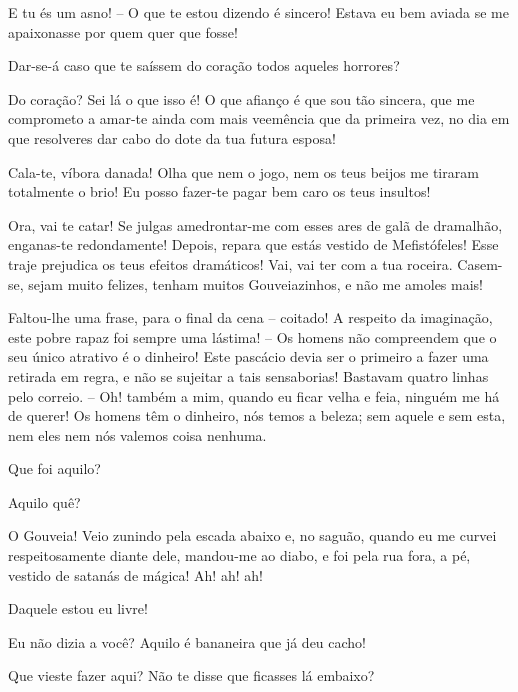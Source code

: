  E tu és um asno! -- O que te estou dizendo é sincero! Estava eu bem
aviada se me apaixonasse por quem quer que fosse!

 Dar-se-á caso que te saíssem do coração todos aqueles horrores?

 Do coração? Sei lá o que isso é! O que afianço é que sou tão
sincera, que me comprometo a amar-te ainda com mais veemência que da primeira vez, no
dia em que resolveres dar cabo do dote da tua futura esposa!

  Cala-te, víbora danada! Olha que nem o jogo,
nem os teus beijos me tiraram totalmente o brio! Eu posso fazer-te pagar
bem caro os teus insultos!

 Ora, vai te catar! Se julgas amedrontar-me com esses ares de galã de
dramalhão, enganas-te redondamente! Depois, repara que estás vestido de
Mefistófeles! Esse traje prejudica os teus efeitos dramáticos! Vai, vai ter
com a tua roceira. Casem-se, sejam muito felizes, tenham muitos Gouveiazinhos, e não
me amoles mais! 


  Faltou-lhe uma frase, para o final da cena -- coitado! A
respeito da imaginação, este pobre rapaz foi sempre uma lástima! -- Os homens não
compreendem que o seu único atrativo é o dinheiro! Este pascácio devia ser
o primeiro a fazer uma retirada em regra, e não se sujeitar a tais
sensaborias! Bastavam quatro linhas pelo correio. -- Oh! também a mim, quando eu ficar
velha e feia, ninguém me há de querer! Os homens têm o dinheiro, nós temos a
beleza; sem aquele e sem esta, nem eles nem nós valemos coisa nenhuma. 

 Que foi aquilo?

 Aquilo quê?

 O Gouveia! Veio zunindo pela escada abaixo e, no saguão, quando
eu me curvei respeitosamente diante dele, mandou-me ao diabo, e foi pela rua
fora, a pé, vestido de satanás de mágica! Ah! ah! ah!

 Daquele estou eu livre!

 Eu não dizia a você? Aquilo é bananeira que já deu cacho!

 Que vieste fazer aqui? Não te disse que ficasses lá embaixo?

